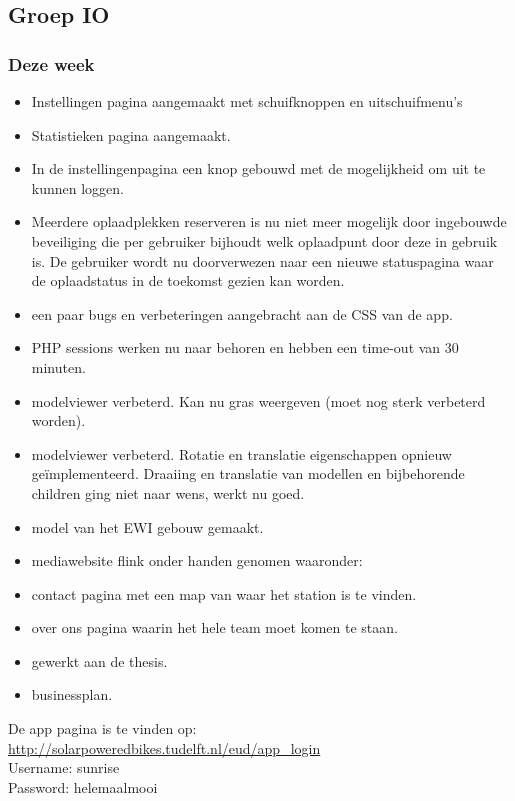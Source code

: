 \subsection*{Groep IO}

\subsubsection*{Deze week}
\begin{itemize}
\item Instellingen pagina aangemaakt met schuifknoppen en uitschuifmenu's
\item Statistieken pagina aangemaakt.
\item In de instellingenpagina een knop gebouwd met de mogelijkheid om uit te kunnen loggen.
\item Meerdere oplaadplekken reserveren is nu niet meer mogelijk door ingebouwde beveiliging die per gebruiker bijhoudt welk oplaadpunt door deze in gebruik is. De gebruiker wordt nu doorverwezen naar een nieuwe statuspagina waar de oplaadstatus in de toekomst gezien kan worden.
\item een paar bugs en verbeteringen aangebracht aan de CSS van de app.
\item PHP sessions werken nu naar behoren en hebben een time-out van 30 minuten.
\item modelviewer verbeterd. Kan nu gras weergeven (moet nog sterk verbeterd worden).
\item modelviewer verbeterd. Rotatie en translatie eigenschappen opnieuw ge\"implementeerd. Draaiing en translatie van modellen en bijbehorende children ging niet naar wens, werkt nu goed.
\item model van het EWI gebouw gemaakt.
\item mediawebsite flink onder handen genomen waaronder:
\item contact pagina met een map van waar het station is te vinden.
\item over ons pagina waarin het hele team moet komen te staan.
\item gewerkt aan de thesis.
\item businessplan.
\end{itemize}

\noindent De app pagina is te vinden op:\\ \url{http://solarpoweredbikes.tudelft.nl/eud/app_login}\\

\noindent Username: sunrise\\
\noindent Password: helemaalmooi\\

